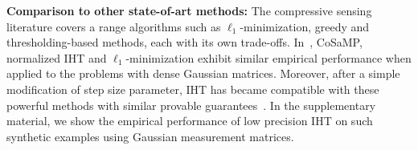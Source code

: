 \documentclass{article}
\newtheorem{theorem}{Theorem}
\begin{document}

{\bf Comparison to other state-of-art methods:} The compressive sensing literature covers a range algorithms such as $\ell_1$-minimization, greedy and thresholding-based methods, each with its own trade-offs. In~\cite{blumensath2010niht}, CoSaMP, normalized IHT and $\ell_1$-minimization exhibit similar empirical performance when applied to the problems with dense Gaussian matrices. Moreover, after a simple modification of step size parameter, IHT has became compatible with these powerful methods with similar provable guarantees~\cite{blumensath2012greedy}. 
In the supplementary material, we show the  
empirical performance of low precision IHT on such synthetic examples using  Gaussian measurement matrices.
\end{document}
